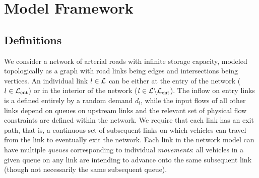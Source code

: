 \section{Model Framework} \label{sec:framework}

\subsection*{Definitions}

We consider a network of arterial roads with infinite storage capacity, modeled topologically as a graph with road links being edges and intersections being vertices. An individual link $l\in\mathcal{L}$  can be either at the entry of the network ($l \in \mathcal{L}_{\text{ent}}$) or in the interior of the network ($l \in\mathcal{L}\backslash \mathcal{L}_{\text{ent}} $). The inflow on entry links is a defined entirely by a random demand $d_{l}$, while the input flows of all other links depend on queues on upstream links and the relevant set of physical flow constraints are defined within the network. We require that each link has an exit path, that is, a continuous set of subsequent links on which vehicles can travel from the link to eventually exit the network.  Each link in the network model can have multiple \emph{queues} corresponding to individual \emph{movements}:  all vehicles in a given queue on any link are intending to advance onto the same subsequent link (though not necessarily the same subsequent queue). 

